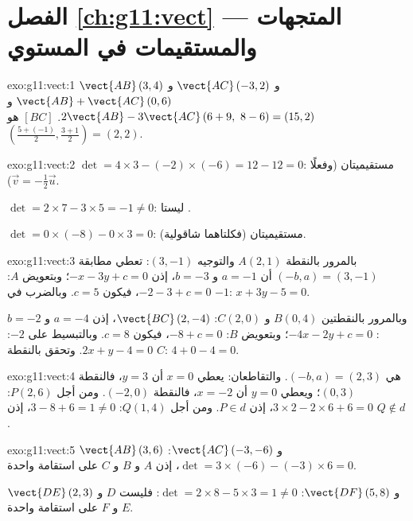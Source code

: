 \section*{الفصل \ref{ch:g11:vect} --- المتجهات والمستقيمات في المستوي}

\begin{solution}{exo:g11:vect:1}
$\vect{AB}\,(3, 4)$ و $\vect{AC}\,(-3, 2)$ و
$\vect{AB} + \vect{AC}\,(0, 6)$ و
$2\vect{AB} - 3\vect{AC}\,(6 + 9,\ 8 - 6) = (15, 2)$. 
$[BC]$ هو $\left(\frac{5 + (-1)}{2}, \frac{3+1}{2}\right) = (2, 2)$.
\end{solution}

\begin{solution}{exo:g11:vect:2}
$\det = 4 \times 3 - (-2) \times (-6) = 12 - 12 = 0$: مستقيميتان (وفعلًا
$\vec v = -\frac12 \vec u$).

$\det = 2 \times 7 - 3 \times 5 = -1 \neq 0$: ليستا .

$\det = 0 \times (-8) - 0 \times 3 = 0$: مستقيميتان (فكلتاهما شاقولية).
\end{solution}

\begin{solution}{exo:g11:vect:3}
بالمرور بالنقطة $A(2,1)$ والتوجيه $(3, -1)$: تعطي مطابقة $(-b, a) = (3, -1)$
أن $a = -1$ و $b = -3$، إذن $-x - 3y + c = 0$؛ وبتعويض $A$: $-2 - 3 + c =
0$، فيكون $c = 5$. وبالضرب في $-1$: $x + 3y - 5 = 0$.

وبالمرور بالنقطتين $B(0,4)$ و $C(2,0)$: $\vect{BC}\,(2, -4)$، إذن $a = -4$ و
$b = -2$: $-4x - 2y + c = 0$؛ وبتعويض $B$: $-8 + c = 0$، فيكون $c = 8$.
وبالتبسيط على $-2$: $2x + y - 4 = 0$. وتحقق بالنقطة $C$: $4 + 0 - 4 = 0$.
\end{solution}

\begin{solution}{exo:g11:vect:4}
 هي $(-b, a) = (2, 3)$. والتقاطعان: يعطي $x = 0$
أن $y = 3$، فالنقطة $(0, 3)$؛ ويعطي $y = 0$ أن $x = -2$، فالنقطة $(-2, 0)$. ومن أجل
$P(2,6)$: $3 \times 2 - 2 \times 6 + 6 = 0$، إذن $P \in d$. ومن أجل $Q(1,4)$:
$3 - 8 + 6 = 1 \neq 0$، إذن $Q \notin d$.
\end{solution}

\begin{solution}{exo:g11:vect:5}
$\vect{AB}\,(3, 6)$ و $\vect{AC}\,(-3, -6)$:
$\det = 3 \times (-6) - (-3) \times 6 = 0$، إذن $A$ و $B$ و $C$ على استقامة واحدة.

$\vect{DE}\,(2, 3)$ و $\vect{DF}\,(5, 8)$:
$\det = 2 \times 8 - 5 \times 3 = 1 \neq 0$: فليست $D$ و $E$ و $F$ على استقامة
واحدة.
\end{solution}

